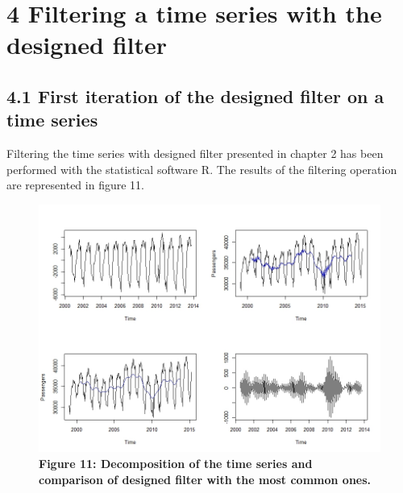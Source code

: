 \documentclass{article}
\begin{document}
\section*{4 Filtering a time series with the designed filter}
\subsection*{\small 4.1 First iteration of the designed filter on a time series}
Filtering the time series with designed filter presented in chapter 2 has been performed with the statistical software R. The results of the filtering operation are represented in figure 11.
\begin{figure}[H]
  \includegraphics[width=\textwidth]{../images/capitolo4/collage.jpeg}
  {\textbf{\scriptsize Figure 11: Decomposition of the time series and comparison of designed filter with the most common ones.}}
\end{figure}
\end{document}
